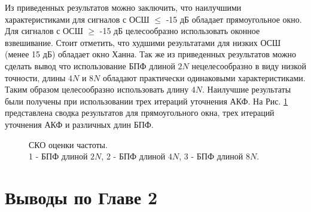 Из приведенных результатов можно заключить, что наилучшими характеристиками для сигналов с ОСШ ${\le}$ -15 дБ обладает прямоугольное окно. Для сигналов с ОСШ ${\ge}$ 
-15 дБ целесообразно использовать оконное взвешивание. Стоит отметить, что худшими результатами для низких ОСШ (менее 15 дБ) обладает окно Ханна.
Так же из приведенных результатов можно сделать вывод что использование БПФ длиной ${2N}$ нецелесообразно в виду низкой
точности, длины ${4N}$ и ${8N}$ обладают практически одинаковыми характеристиками. Таким образом целесообразно использовать длину ${4N}$. Наилучшие результаты были получены при
использовании трех итераций уточнения АКФ. На Рис. \ref{pic:2vs4vs8} представлена сводка результатов для прямоугольного окна, трех итераций уточнения АКФ и различных длин БПФ.

\begin{figure}[h]
	\center{}
	\caption{СКО оценки частоты.\\1 - БПФ длиной ${2N}$, 2 - БПФ длиной ${4N}$, 3 - БПФ длиной ${8N}$.}
	\label{pic:2vs4vs8}
\end{figure}


\section{Выводы по Главе 2}

